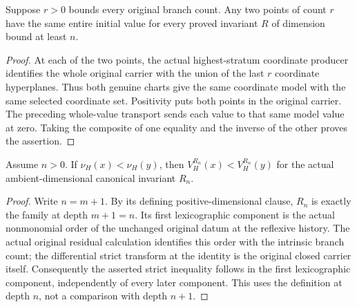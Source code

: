 \begin{lemma}
\label{hir:general-nc-generic-initial-highest-stratum-constant}
\leanok
{}
Suppose $r>0$ bounds every original branch count. Any two points of count
$r$ have the same entire initial value for every proved invariant $R$
of dimension bound at least $n$.
\end{lemma}
\begin{proof}
At each of the two points, the actual highest-stratum coordinate producer
identifies the whole original carrier with the union of the last $r$
coordinate hyperplanes. Thus both genuine charts give the same coordinate
model with the same selected coordinate set. Positivity puts both points
in the original carrier. The preceding whole-value transport sends each
value to that same model value at zero. Taking the composite of one
equality and the inverse of the other proves the assertion.
\end{proof}

\begin{lemma}
\label{hir:general-nc-ambient-canonical-initial-first-entry}
\leanok
{}
Assume $n>0$. If $\nu_H(x)<\nu_H(y)$, then
$V^{R_n}_H(x)<V^{R_n}_H(y)$ for the actual ambient-dimensional canonical
invariant $R_n$.
\end{lemma}
\begin{proof}
Write $n=m+1$. By its defining positive-dimensional clause, $R_n$ is
exactly the family at depth $m+1=n$. Its first lexicographic component
is the actual nonmonomial order of the unchanged original datum at the
reflexive history. The actual original residual calculation identifies
this order with the intrinsic branch count; the differential strict
transform at the identity is the original closed carrier itself.
Consequently the asserted strict inequality follows in the first
lexicographic component, independently of every later component. This
uses the definition at depth $n$, not a comparison with depth $n+1$.
\end{proof}

